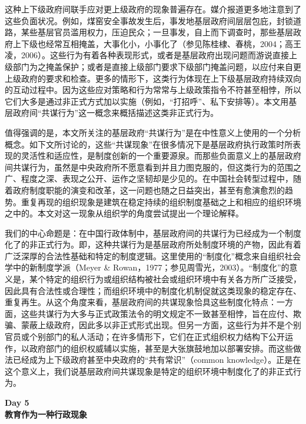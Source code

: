 \documentclass[12pt,a4paper]{article}
\begin{document}
这种上下级政府间联手应对更上级政府的现象普遍存在。媒介报道更多地注意到了这些负面状况。例如，煤窑安全事故发生后，事发地基层政府间层层包庇，封锁道路，某些基层官员滥用权力，压迫民众；一旦事发，自上而下调查时，那些基层政府上下级也经常互相掩盖，大事化小，小事化了（参见陈桂棣、春桃，2004；高王凌，2006）。这些行为有着各种表现形式，或者是基层政府出现问题而游说直接上级部门为之掩盖保护；或者是直接上级部门要求下级部门掩盖问题，以应付来自更上级政府的要求和检查。更多的情形下，这类行为体现在上下级基层政府持续双向的互动过程中。因为这些应对策略和行为常常与上级政策指令不符甚至相悖，所以它们大多是通过非正式方式加以实施（例如，“打招呼”、私下安排等）。本文用基层政府间“共谋行为”这一概念来概括描述这类非正式行为。



值得强调的是，本文所关注的基层政府“共谋行为”是在中性意义上使用的一个分析概念。如下文所讨论的，这些“共谋现象”在很多情况下是基层政府执行政策时所表现的灵活性和适应性，是制度创新的一个重要源泉。而那些负面意义上的基层政府间共谋行为，虽然是中央政府所不愿意看到并且力图克服的，但这类行为的范围之广、程度之深、表现之公开、运作之坚韧却是少见的。在中国社会转型过程中，随着政府制度职能的演变和改革，这一问题也随之日益突出，甚至有愈演愈烈的趋势。重复再现的组织现象是建筑在稳定持续的组织制度基础之上和相应的组织环境之中的。本文对这一现象从组织学的角度尝试提出一个理论解释。



我们的中心命题是：在中国行政体制中，基层政府间的共谋行为已经成为一个制度化了的非正式行为。即，这种共谋行为是基层政府所处制度环境的产物，因此有着广泛深厚的合法性基础和特定的制度逻辑。这里使用的“制度化”概念来自组织社会学中的新制度学派（Meyer \& Rowan，1977；参见周雪光，2003）。“制度化”的意义是，某个特定的组织行为或组织结构被社会或组织环境中有关各方所广泛接受，因此具有合法性或合理性；而组织环境中的制度化机制促就这类现象的稳定存在、重复再生。从这个角度来看，基层政府间的共谋现象恰具这些制度化特点：一方面，这些共谋行为大多与正式政策法令的明文规定不一致甚至相悖，旨在应付、欺骗、蒙蔽上级政府，因此多以非正式形式出现。但另一方面，这些行为并不是个别官员或个别部门的私人活动；在许多情形下，它们在正式组织权力结构下公开运作，以政府部门的组织权威辅以实施，甚至是大张旗鼓地加以部署安排。而这些做法已经成为上下级政府甚至中央政府的“共有常识”（common knowledge）。正是在这个意义上，我们说基层政府间共谋现象是特定的组织环境中制度化了的非正式行为。
\par{}
\newpage
\begin{center}
{\LARGE \bfseries Day 5\\[1em]教育作为一种行政现象}
\end{center}
\vspace{3em}
\end{document}
